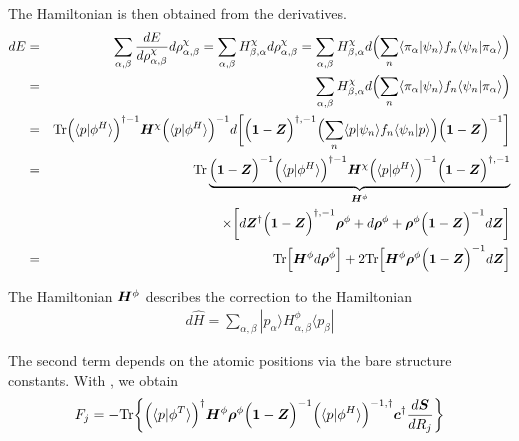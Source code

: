 \documentclass[11pt,a4paper]{report}
\begin{document}
The Hamiltonian is then obtained from the derivatives.
\begin{eqnarray}
dE&=&
\sum_{\alpha,\beta}\frac{dE}{d\rho^\chi_{\alpha,\beta}}d\rho^\chi_{\alpha,\beta}
=\sum_{\alpha,\beta} H^\chi_{\beta,\alpha}d\rho^\chi_{\alpha,\beta}
=\sum_{\alpha,\beta} H^\chi_{\beta,\alpha}d
\Bigl(
\sum_n\langle\pi_\alpha|\psi_n\rangle f_n\langle\psi_n|\pi_\alpha\rangle
\Bigr)
\nonumber\\
%
%
&=&\sum_{\alpha,\beta} H^\chi_{\beta,\alpha}d
\Bigl(\sum_n\langle\pi_\alpha|\psi_n\rangle f_n\langle\psi_n|\pi_\alpha\rangle\Bigr)
\nonumber\\
%
%
&=&\Tr
\Bigl(\langle{p}|\phi^H\rangle\Bigr)^{\dagger-1}
\mat{H}^\chi
\Bigl(\langle{p}|\phi^H\rangle\Bigr)^{-1}
d\biggl[
\Bigl(\mat{1}-\mat{Z}\Bigr)^{\dagger,-1}
\Bigl(\sum_n\langle{p}|\psi_n\rangle f_n\langle\psi_n|{p}\rangle\Bigr)
\Bigl(\mat{1}-\mat{Z}\Bigr)^{-1}\biggr]
\nonumber\\
%
%
&=&\Tr
\underbrace{
\Bigl(\mat{1}-\mat{Z}\Bigr)^{-1}
\Bigl(\langle{p}|\phi^H\rangle\Bigr)^{\dagger-1}
\mat{H}^\chi
\Bigl(\langle{p}|\phi^H\rangle\Bigr)^{-1}
\Bigl(\mat{1}-\mat{Z}\Bigr)^{\dagger,-1}}_{\mat{H}^\phi}
\nonumber\\
&&
\times\biggl[
d\mat{Z}^\dagger\Bigl(\mat{1}-\mat{Z}\Bigr)^{\dagger,-1}\mat{\rho}^\phi
+
d\mat{\rho}^\phi
+
\mat{\rho}^\phi \Bigl(\mat{1}-\mat{Z}\Bigr)^{-1}d\mat{Z}
\biggr]
\nonumber\\
%
%
&=&\Tr\Bigl[\mat{H}^\phi d\mat{\rho}^\phi\Bigr]
+2\Tr\Bigl[
\mat{H}^\phi \mat{\rho}^\phi 
\Bigl(\mat{1}-\mat{Z}\Bigr)^{-1}
d\mat{Z}\Bigr]
\end{eqnarray}


The Hamiltonian $\bm{H}^\phi$ describes the correction to the
Hamiltonian
\begin{eqnarray}
d\hat{H}=\sum_{\alpha,\beta} |p_\alpha\rangle H^\phi_{\alpha,\beta}\langle{p}_\beta|
\end{eqnarray}

The second term depends on the atomic positions via the bare structure
constants. With , we obtain
\begin{eqnarray}
F_j=-\mathrm{Tr}\biggl\lbrace
\Bigl(\langle{p}|\phi^T\rangle\Bigr)^{\dagger}
\bm{H}^\phi 
\bm{\rho}^\phi 
\Bigl(\bm{1}-\bm{Z}\Bigr)^{-1}
\Bigl(\langle{p}|\phi^H\rangle\Bigr)^{-1,\dagger}
\bm{c}^\dagger\frac{d\bm{S}}{dR_j}
\biggr\rbrace
\end{eqnarray}

\end{document}
